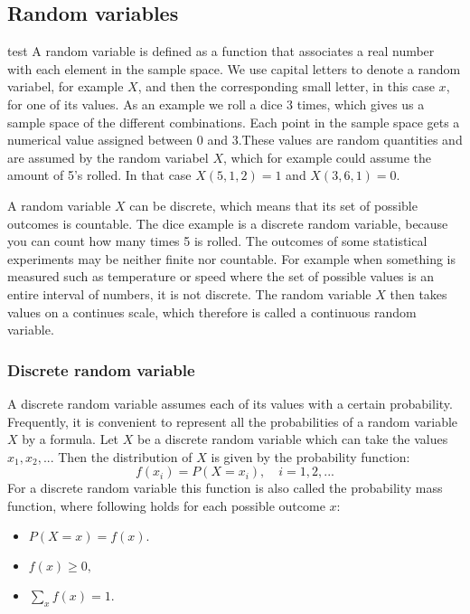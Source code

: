
\subsection{Random variables}
test
A random variable is defined as a function that associates a real number with each element in the sample space. We use capital letters to denote a random variabel, for example $X$, and then the corresponding small letter, in this case $x$, for one of its values. As an example we roll a dice 3 times, which gives us a sample space of the different combinations. Each point in the sample space gets a numerical value assigned between 0 and 3.These values are random quantities and are assumed by the random variabel $X$, which for example could assume the amount of 5's rolled. In that case $X(5,1,2) = 1$ and $X(3,6,1) = 0$.
\newline

A random variable $X$ can be discrete, which means that its set of possible outcomes is countable. The dice example is a discrete random variable, because you can count how many times 5 is rolled. The outcomes of some statistical experiments may be neither finite nor countable. For example when something is measured such as temperature or speed where the set of possible values is an entire interval of numbers, it is not discrete. The random variable $X$ then takes values on a continues scale, which therefore is called a continuous random variable.

\subsubsection{Discrete random variable}
A discrete random variable assumes each of its values with a certain probability. Frequently, it is convenient to represent all the probabilities of a random variable $X$ by a formula. Let $X$ be a discrete random variable which can take the values $x_{1}, x_{2},...$ Then the distribution of $X$ is given by the probability function:
$$f(x_{i})=P(X=x_{i}),\quad i=1,2,...$$
\newline
For a discrete random variable this function is also called the probability mass function, where following holds for each possible outcome $x$:

\begin{itemize}
	\item $P(X = x) = f(x).$
	\item $f(x) \geq 0,$
	\item $\sum_x f(x) = 1.$
\end{itemize}

